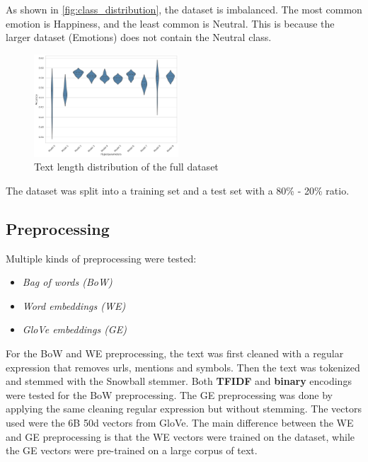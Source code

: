 As shown in \autoref{fig:class_distribution},
the dataset is imbalanced. The most common
emotion is Happiness, and the least common
is Neutral. This is because the larger dataset
(Emotions) does not contain the Neutral class.

\begin{figure}[H]
    \centering
    \includegraphics[width=0.48\textwidth]{images/violin_plot_neural_network.png}
    \caption{Text length distribution of the full dataset}
    \label{fig:length_distribution}
\end{figure}

The dataset was split into a training set
and a test set with a 80\% - 20\% ratio.

\subsection{Preprocessing}
Multiple kinds of preprocessing were tested:
\begin{itemize}
    \item \textit{Bag of words (BoW)}
    \item \textit{Word embeddings (WE)}
    \item \textit{GloVe embeddings (GE)}
\end{itemize}
For the BoW and WE preprocessing, the text was
first cleaned with a regular expression that
removes urls, mentions and symbols. Then the
text was tokenized and stemmed with the 
Snowball stemmer. Both \textbf{TFIDF} and 
\textbf{binary} encodings were tested for
the BoW preprocessing.
The GE preprocessing was done by applying 
the same cleaning regular
expression but without stemming. The vectors
used were the 6B 50d vectors from
GloVe\cite{glove}.
The main difference between the WE and GE
preprocessing is that the WE vectors were
trained on the dataset, while the GE vectors
were pre-trained on a large corpus of text.